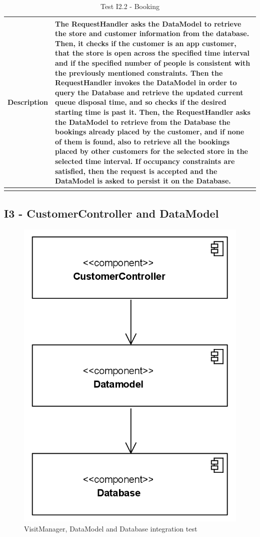 \documentclass[a4paper,oneside,11pt]{book}
\begin{document}
\begin{longtable}[c]{|>{\bfseries{}}c|H{.5\textwidth}|}
        Description & The RequestHandler asks the DataModel to retrieve the store and customer information from the database. Then, it checks if the  customer is an app customer, that the store is open across the specified time interval and if the specified number of people is consistent with the previously mentioned constraints. Then the RequestHandler invokes the DataModel in order to query the Database and retrieve the updated current queue disposal time, and so checks if the desired starting time is past it. Then, the RequestHandler asks the DataModel to retrieve from the Database the bookings already placed by the customer, and if none of them is found, also to retrieve all the bookings placed by other customers for the selected store in the selected time interval. If occupancy constraints are satisfied, then the request is accepted and the DataModel is asked to persist it on the Database. \\ \hline
        \caption{Test I2.2 - Booking}
        \label{table:test_I2.2}
    \end{longtable}
    
    \subsection{I3 - CustomerController and DataModel}
    \begin{figure}[H]
        \centering
        \includegraphics[width=.5\textwidth, height=\textheight, keepaspectratio]{pictures/integration_diagrams/integration_customercontroller_datamodel.png}
        \caption{VisitManager, DataModel and Database integration test}
        \label{figure:integration_customercontroller_datamodel}
    \end{figure}
    
\end{document}
